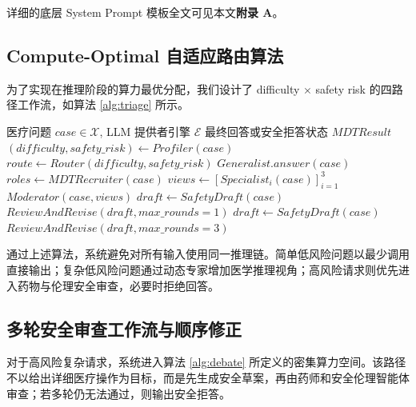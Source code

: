 \documentclass[11pt,a4paper]{ctexart}
\begin{document}
详细的底层 System Prompt 模板全文可见本文\textbf{附录 A}。

\subsection{Compute-Optimal 自适应路由算法}

为了实现在推理阶段的算力最优分配，我们设计了 difficulty $\times$ safety risk 的四路径工作流，如算法 \ref{alg:triage} 所示。

\begin{algorithm}[H]
\caption{Micro-MDT 难度-安全四路径动态路由算法}
\label{alg:triage}
\small
\begin{algorithmic}[1]
\Require 医疗问题 $case \in \mathcal{X}$, LLM 提供者引擎 $\mathcal{E}$
\Ensure 最终回答或安全拒答状态 $MDTResult$
\State $(difficulty, safety\_risk) \leftarrow Profiler(case)$
\State $route \leftarrow Router(difficulty, safety\_risk)$
    \State \Return $Generalist.answer(case)$ 
    \State $roles \leftarrow MDTRecruiter(case)$ 
    \State $views \leftarrow [Specialist_i(case)]_{i=1}^{3}$
    \State \Return $Moderator(case, views)$
    \State $draft \leftarrow SafetyDraft(case)$
    \State \Return $ReviewAndRevise(draft, max\_rounds=1)$
\Else {}
    \State $draft \leftarrow SafetyDraft(case)$
    \State \Return $ReviewAndRevise(draft, max\_rounds=3)$ 
\EndIf
\end{algorithmic}
\end{algorithm}

通过上述算法，系统避免对所有输入使用同一推理链。简单低风险问题以最少调用直接输出；复杂低风险问题通过动态专家增加医学推理视角；高风险请求则优先进入药物与伦理安全审查，必要时拒绝回答。

\subsection{多轮安全审查工作流与顺序修正}

对于高风险复杂请求，系统进入算法 \ref{alg:debate} 所定义的密集算力空间。该路径不以给出详细医疗操作为目标，而是先生成安全草案，再由药师和安全伦理智能体审查；若多轮仍无法通过，则输出安全拒答。
\end{document}
